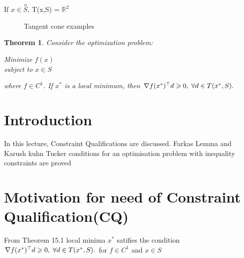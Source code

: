 \documentclass[twoside]{article}
\newcounter{lecnum}
\newtheorem{theorem}{Theorem}[lecnum]
\begin{document}
If $x \in \overset{o}{S}$, T(x,S) = $\mathbb{R}^2$
\begin{figure}[h]
	\centering
    \qquad
    \caption{Tangent cone examples}
    \label{fig:example}
\end{figure}

\begin{theorem}
Consider the optimization problem:
\begin{center}
    Minimize $f(x)$\\
    subject to $x\in S$ 
\end{center}
where $f \in C^{1}$. If $x^{*}$ is a local minimum, then $\nabla f(x^{*})^{\top}d \geqslant 0, \hspace{1mm}\forall d \in T(x^{*},S).$
\end{theorem}



\section{Introduction}
In this lecture, Constraint Qualifications are discussed. Farkas Lemma and Karush kuhn Tucker conditions for an optimisation problem with inequality constraints are proved  

\section{Motivation for need of Constraint Qualification(CQ)}
From Theorem 15.1 local minima $x^*$ satifies the condition $\nabla f(x^{*})^{\top}d \geqslant 0, \hspace{1mm}\forall d \in T(x^{*},S).$ for $f \in C^{1}$ and $x \in S$
\end{document}
